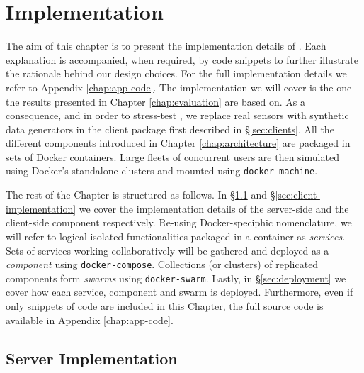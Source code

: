 \chapter{Implementation} \label{chap:implementation}

The aim of this chapter is to present the implementation details of \projName.
Each explanation is accompanied, when required, by code snippets to further illustrate the rationale behind our design choices.
For the full implementation details we refer to Appendix \ref{chap:app-code}.
The implementation we will cover is the one the results presented in Chapter \ref{chap:evaluation} are based on.
As a consequence, and in order to stress-test \projName, we replace real sensors with synthetic data generators in the client package first described in \S\ref{sec:clients}.
All the different components introduced in Chapter \ref{chap:architecture} are packaged in sets of Docker containers.
Large fleets of concurrent users are then simulated using Docker's standalone clusters and mounted using \texttt{docker-machine}.

The rest of the Chapter is structured as follows.
In \S\ref{sec:server-implementation} and \S\ref{sec:client-implementation} we cover the implementation details of the server-side and the client-side component respectively.
Re-using Docker-speciphic nomenclature, we will refer to logical isolated functionalities packaged in a container as \emph{services}.
Sets of services working collaboratively will be gathered and deployed as a \emph{component} using \texttt{docker-compose}.
Collections (or clusters) of replicated components form \emph{swarms} using \texttt{docker-swarm}.
Lastly, in \S\ref{sec:deployment} we cover how each service, component and swarm is deployed.
Furthermore, even if only snippets of code are included in this Chapter, the full source code is available in Appendix \ref{chap:app-code}.

\section{Server Implementation} \label{sec:server-implementation}

